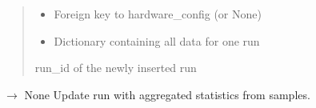 \documentclass[letterpaper,10pt,english]{sphinxmanual}
\begin{document}
\begin{fulllineitems}
\begin{fulllineitems}
\begin{quote}
\begin{description}
\begin{itemize}
\item {} 
\sphinxAtStartPar
{} \textendash{} Foreign key to hardware\_config (or None)

\item {} 
\sphinxAtStartPar
{} \textendash{} Dictionary containing all data for one run

\end{itemize}

\sphinxAtStartPar
run\_id of the newly inserted run

\end{description}\end{quote}

\end{fulllineitems}


\begin{fulllineitems}
\label{\detokenize{core.database.repositories:core.database.repositories.RunsRepository.update_run_stats}}
\pysigstartsignatures
\pysiglinewithargsret
{}
{\sphinxparamcomma {}}
{{ $\rightarrow$ None}}
\pysigstopsignatures
\sphinxAtStartPar
Update run with aggregated statistics from samples.

\end{fulllineitems}


\end{fulllineitems}

\end{document}
